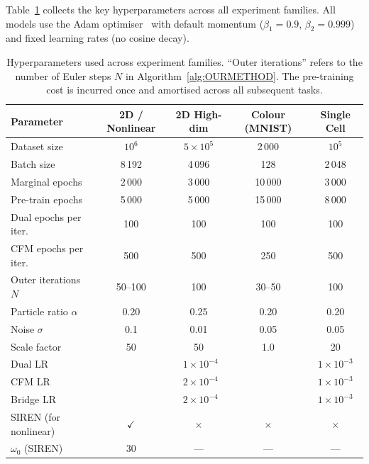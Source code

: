 \documentclass[11pt]{article}
\theoremstyle{definition}
\numberwithin{equation}{section}%
\begin{document}
Table~\ref{tab:hyperparams_full} collects the key hyperparameters across all
experiment families. All models use the Adam optimiser~\citep{kingma2014adam} with default momentum
($\beta_1 = 0.9$, $\beta_2 = 0.999$) and fixed learning rates (no
cosine decay).


\begin{table}[ht]
\centering
\caption{Hyperparameters used across experiment families.
  ``Outer iterations'' refers to the number of Euler steps $N$ in
  Algorithm~\ref{alg:OURMETHOD}. The pre-training cost is incurred once and
  amortised across all subsequent tasks.}
\label{tab:hyperparams_full}
\vspace{2pt}
\setlength{\tabcolsep}{5pt}
\begin{tabular}{lcccc}
\toprule
Parameter & 2D / Nonlinear & 2D High-dim & Colour (MNIST) & Single Cell \\
\midrule
Dataset size          & $10^6$  & $5\times10^5$ & 2\,000  & $10^5$  \\
Batch size            & 8\,192  & 4\,096        & 128     & 2\,048  \\
Marginal epochs       & 2\,000  & 3\,000        & 10\,000 & 3\,000  \\
Pre-train epochs      & 5\,000  & 5\,000        & 15\,000 & 8\,000  \\
Dual epochs per iter. & 100     & 100           & 100     & 100     \\
CFM epochs per iter.  & 500     & 500           & 250     & 500     \\
Outer iterations $N$  & 50--100 & 100           & 30--50  & 100     \\
Particle ratio $\alpha$ & 0.20  & 0.25          & 0.20    & 0.20    \\
Noise $\sigma$        & 0.1     & 0.01          & 0.05    & 0.05    \\
Scale factor          & 50      & 50            & 1.0     & 20      \\
Dual LR               & \multicolumn{3}{c}{$1\times10^{-4}$} & $1\times10^{-3}$ \\
CFM LR                & \multicolumn{3}{c}{$2\times10^{-4}$} & $1\times10^{-3}$ \\
Bridge LR             & \multicolumn{3}{c}{$2\times10^{-4}$} & $1\times10^{-3}$ \\
\midrule
SIREN (for nonlinear) & $\checkmark$ & $\times$ & $\times$ & $\times$ \\
$\omega_0$ (SIREN)    & 30     & ---           & ---     & ---     \\
\bottomrule
\end{tabular}
\end{table}
\end{document}
